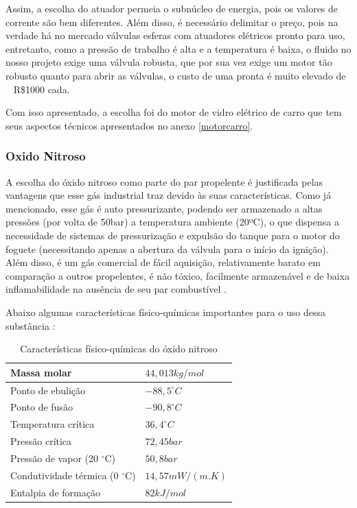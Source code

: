 \par Assim, a escolha do atuador permeia o subnúcleo de energia, pois os valores de corrente são bem diferentes. Além disso, é necessário delimitar o preço, pois na verdade há no mercado válvulas esferas com atuadores elétricos pronto para uso, entretanto, como a pressão de trabalho é alta e a temperatura é baixa, o fluido no nosso projeto exige uma válvula robusta, que por sua vez exige um motor tão robusto quanto para abrir as válvulas, o custo de uma pronta é muito elevado de ~ R\$1000 cada. 

\par Com isso apresentado, a escolha foi do motor de vidro elétrico de carro que tem seus aspectos técnicos apresentados no anexo \ref{motorcarro}.


\subsubsection{Oxido Nitroso}
\label{sec:n2o}

A escolha do óxido nitroso como parte do par propelente é justificada pelas vantagens que esse gás industrial traz devido às suas características. Como já mencionado, esse gás é auto pressurizante, podendo ser armazenado a altas pressões (por volta de 50bar) a temperatura ambiente (20ºC), o que dispensa a necessidade de sistemas de pressurização e expulsão do tanque para o motor do foguete (necessitando apenas a abertura da válvula para o início da ignição). Além disso, é um gás comercial de fácil aquisição, relativamente barato em comparação a outros propelentes, é não tóxico, facilmente armazenável e de baixa inflamabilidade na ausência de seu par combustível \cite{rogerapazavasquez2017}. 

Abaixo algumas características físico-químicas importantes para o uso dessa substância \cite{rogerapazavasquez2017}: 

\begin{table}[H]
\centering
\begin{tabular}{|l|l|}
\hline
Massa molar & $44,013 kg/mol$ \\ \hline
Ponto de ebulição & $-88,5 ^{\circ}C$  \\ \hline
Ponto de fusão & $-90,8 ^{\circ}C$  \\ \hline
Temperatura crítica & $36,4 ^{\circ}C$ \\ \hline
Pressão crítica & $72,45 bar$  \\ \hline
Pressão de vapor (20 $^{\circ}$C) & $50,8 bar$  \\ \hline
Condutividade térmica (0 $^{\circ}$C) & $14,57 mW/(m.K)$  \\ \hline
Entalpia de formação & $82 kJ/mol$  \\ \hline
\end{tabular}
\caption{Características físico-químicas do óxido nitroso}
\label{tab:n2o}
\end{table}

